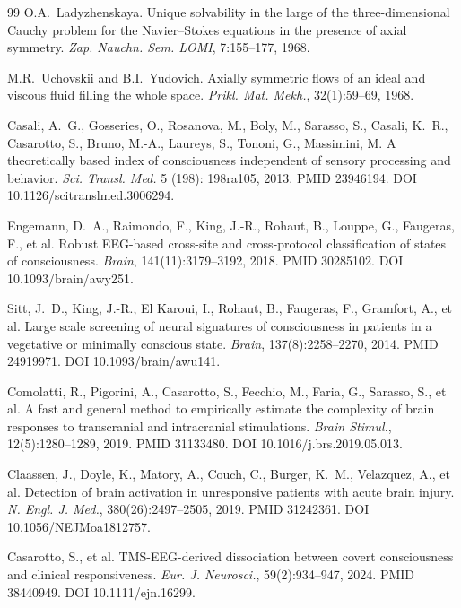 \documentclass[11pt,a4paper]{amsart}
\theoremstyle{plain}
\theoremstyle{definition}
\begin{document}
\begin{thebibliography}{99}
O.A.~Ladyzhenskaya.
\newblock Unique solvability in the large of the three-dimensional Cauchy problem for the Navier--Stokes equations in the presence of axial symmetry.
\newblock \emph{Zap. Nauchn. Sem. LOMI}, 7:155--177, 1968.

M.R.~Uchovskii and B.I.~Yudovich.
\newblock Axially symmetric flows of an ideal and viscous fluid filling the whole space.
\newblock \emph{Prikl. Mat. Mekh.}, 32(1):59--69, 1968.

Casali, A.~G., Gosseries, O., Rosanova, M., Boly, M., Sarasso, S., Casali, K.~R., Casarotto, S., Bruno, M.-A., Laureys, S., Tononi, G., Massimini, M.
\newblock A theoretically based index of consciousness independent of sensory processing and behavior.
\newblock \emph{Sci. Transl. Med.} 5 (198): 198ra105, 2013. PMID 23946194. DOI 10.1126/scitranslmed.3006294.

Engemann, D.~A., Raimondo, F., King, J.-R., Rohaut, B., Louppe, G., Faugeras, F., et al.
\newblock Robust EEG-based cross-site and cross-protocol classification of states of consciousness.
\newblock \emph{Brain}, 141(11):3179--3192, 2018. PMID 30285102. DOI 10.1093/brain/awy251.

Sitt, J.~D., King, J.-R., El Karoui, I., Rohaut, B., Faugeras, F., Gramfort, A., et al.
\newblock Large scale screening of neural signatures of consciousness in patients in a vegetative or minimally conscious state.
\newblock \emph{Brain}, 137(8):2258--2270, 2014. PMID 24919971. DOI 10.1093/brain/awu141.

Comolatti, R., Pigorini, A., Casarotto, S., Fecchio, M., Faria, G., Sarasso, S., et al.
\newblock A fast and general method to empirically estimate the complexity of brain responses to transcranial and intracranial stimulations.
\newblock \emph{Brain Stimul.}, 12(5):1280--1289, 2019. PMID 31133480. DOI 10.1016/j.brs.2019.05.013.

Claassen, J., Doyle, K., Matory, A., Couch, C., Burger, K.~M., Velazquez, A., et al.
\newblock Detection of brain activation in unresponsive patients with acute brain injury.
\newblock \emph{N. Engl. J. Med.}, 380(26):2497--2505, 2019. PMID 31242361. DOI 10.1056/NEJMoa1812757.

Casarotto, S., et al.
\newblock TMS-EEG-derived dissociation between covert consciousness and clinical responsiveness.
\newblock \emph{Eur. J. Neurosci.}, 59(2):934--947, 2024. PMID 38440949. DOI 10.1111/ejn.16299.


\end{thebibliography}
\end{document}
